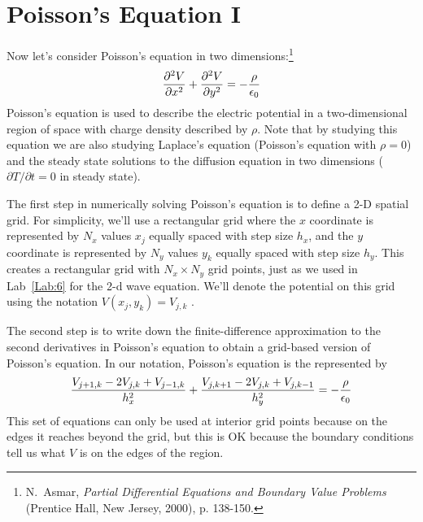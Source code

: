 \chapter{Poisson's Equation I}
 \label{Lab:21} 


Now let's consider Poisson's equation in two dimensions:\footnote{N.\
Asmar, {\it Partial Differential Equations and Boundary Value
Problems} (Prentice Hall, New Jersey, 2000), p. 138-150.}
\begin{equation}
    {\partial^2 V \over \partial x^2} +
    {\partial^2 V \over \partial y^2} = - {\rho \over \epsilon_0}
\end{equation}
Poisson's equation is used to describe the electric potential in a
two-dimensional region of space with charge density described by
$\rho$. Note that by studying this equation we are also studying
Laplace's equation (Poisson's equation with $\rho=0$) and the steady
state solutions to the diffusion equation in two dimensions
($\partial T /
\partial t = 0$ in steady state).


The first step in numerically solving Poisson's equation is to define
a 2-D spatial grid. For simplicity, we'll use a rectangular grid
where the $x$ coordinate is represented by $N_x$ values $x_j$ equally
spaced with step size $h_x$, and the $y$ coordinate is represented by
$N_y$ values $y_k$ equally spaced with step size $h_y$.  This creates
a rectangular grid with $N_x \times N_y$ grid points, just as we used
in Lab~\ref{Lab:6} for the 2-d wave equation.  We'll denote the
potential on this grid using the notation $V(x_j,y_k) = V_{j,k}$ .

The second step is to write down the finite-difference
approximation to the second derivatives in Poisson's equation
to obtain a grid-based version of Poisson's equation.
In our notation, Poisson's equation is the represented by
\begin{equation}
    {V_{j+1,k}-2 V_{j,k}+V_{j-1,k} \over h_x^2} +
    {V_{j,k+1}-2 V_{j,k}+V_{j,k-1} \over h_y^2} =
    - {\rho \over \epsilon_0}
    \label{fdpoisson}
\end{equation}
This set of equations can only be used at interior grid points
because on the edges it reaches beyond the grid, but this is OK
because the boundary conditions tell us what $V$ is on the edges of
the region.

